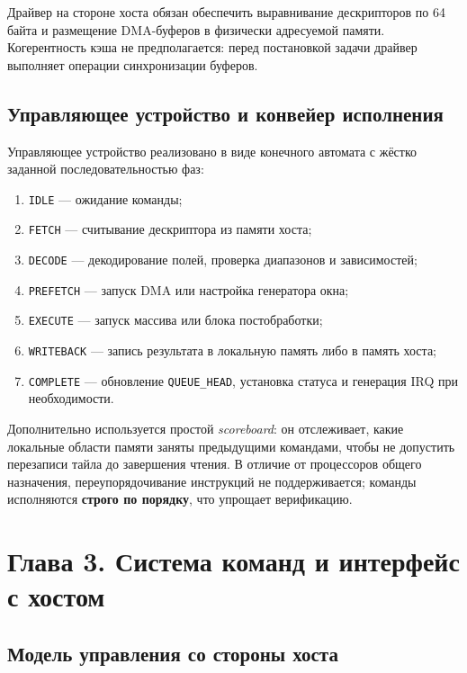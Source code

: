 \documentclass[12pt,a4paper]{article}
\begin{document}
Драйвер на стороне хоста обязан обеспечить выравнивание дескрипторов по 64 байта и размещение DMA-буферов в физически адресуемой памяти. Когерентность кэша не предполагается: перед постановкой задачи драйвер выполняет операции синхронизации буферов.

\subsection{Управляющее устройство и конвейер исполнения}

Управляющее устройство реализовано в виде конечного автомата с жёстко заданной последовательностью фаз:
\begin{enumerate}
    \item \texttt{IDLE} --- ожидание команды;
    \item \texttt{FETCH} --- считывание дескриптора из памяти хоста;
    \item \texttt{DECODE} --- декодирование полей, проверка диапазонов и зависимостей;
    \item \texttt{PREFETCH} --- запуск DMA или настройка генератора окна;
    \item \texttt{EXECUTE} --- запуск массива или блока постобработки;
    \item \texttt{WRITEBACK} --- запись результата в локальную память либо в память хоста;
    \item \texttt{COMPLETE} --- обновление \texttt{QUEUE\_HEAD}, установка статуса и генерация IRQ при необходимости.
\end{enumerate}

Дополнительно используется простой \textit{scoreboard}: он отслеживает, какие локальные области памяти заняты предыдущими командами, чтобы не допустить перезаписи тайла до завершения чтения. В отличие от процессоров общего назначения, переупорядочивание инструкций не поддерживается; команды исполняются \textbf{строго по порядку}, что упрощает верификацию.

\section{Глава 3. Система команд и интерфейс с хостом}

\subsection{Модель управления со стороны хоста}
\end{document}
